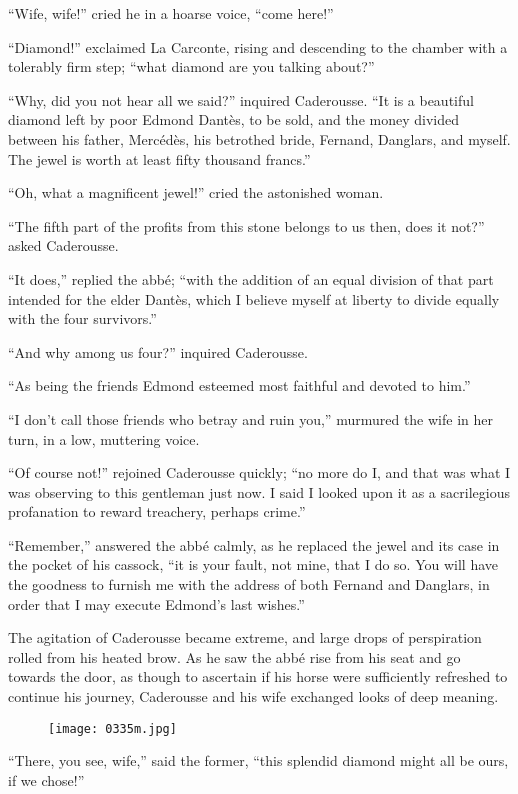 “Wife, wife!” cried he in a hoarse voice, “come here!”

“Diamond!” exclaimed La Carconte, rising and descending to the chamber
with a tolerably firm step; “what diamond are you talking about?”

“Why, did you not hear all we said?” inquired Caderousse. “It is a
beautiful diamond left by poor Edmond Dantès, to be sold, and the money
divided between his father, Mercédès, his betrothed bride, Fernand,
Danglars, and myself. The jewel is worth at least fifty thousand
francs.”

“Oh, what a magnificent jewel!” cried the astonished woman.

“The fifth part of the profits from this stone belongs to us then, does
it not?” asked Caderousse.

“It does,” replied the abbé; “with the addition of an equal division of
that part intended for the elder Dantès, which I believe myself at
liberty to divide equally with the four survivors.”

“And why among us four?” inquired Caderousse.

“As being the friends Edmond esteemed most faithful and devoted to
him.”

“I don’t call those friends who betray and ruin you,” murmured the wife
in her turn, in a low, muttering voice.

“Of course not!” rejoined Caderousse quickly; “no more do I, and that
was what I was observing to this gentleman just now. I said I looked
upon it as a sacrilegious profanation to reward treachery, perhaps
crime.”

“Remember,” answered the abbé calmly, as he replaced the jewel and its
case in the pocket of his cassock, “it is your fault, not mine, that I
do so. You will have the goodness to furnish me with the address of
both Fernand and Danglars, in order that I may execute Edmond’s last
wishes.”

The agitation of Caderousse became extreme, and large drops of
perspiration rolled from his heated brow. As he saw the abbé rise from
his seat and go towards the door, as though to ascertain if his horse
were sufficiently refreshed to continue his journey, Caderousse and his
wife exchanged looks of deep meaning.

\begin{figure}[ht]
\texttt{[image: 0335m.jpg]}
\end{figure}

“There, you see, wife,” said the former, “this splendid diamond might
all be ours, if we chose!”

